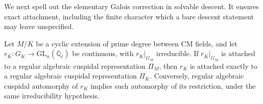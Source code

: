 We next spell out the elementary Galois correction in
solvable descent. It ensures exact attachment, including
the finite character which a bare descent statement may
leave unspecified.

\begin{srlemma}\label{lem:sr-cyclic-exact-descent}
Let \(M/K\) be a cyclic extension of prime degree between
CM fields, and let \(r_K:G_K\to
\mathrm{GL}_n(\overline{\mathbb Q}_\ell)\) be continuous,
with \(r_K|_{G_M}\) irreducible.
If \(r_K|_{G_M}\) is attached to a regular algebraic
cuspidal representation \(\Pi_M\), then \(r_K\) is attached
exactly to a regular algebraic cuspidal representation
\(\Pi_K\).
Conversely, regular algebraic cuspidal automorphy of
\(r_K\) implies such automorphy of its restriction, under
the same irreducibility hypothesis.
\end{srlemma}
